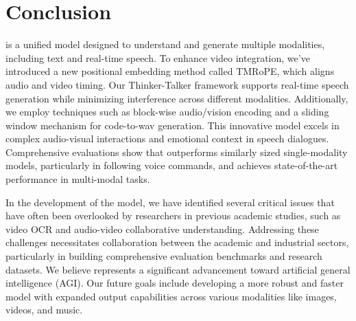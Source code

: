 
\section{Conclusion}
\label{sec:conclusion}
\method is a unified model designed to understand and generate multiple modalities, including text and real-time speech. To enhance video integration, we've introduced a new positional embedding method called TMRoPE, which aligns audio and video timing. Our Thinker-Talker framework supports real-time speech generation while minimizing interference across different modalities. Additionally, we employ techniques such as block-wise audio/vision encoding and a sliding window mechanism for code-to-wav generation. This innovative model excels in complex audio-visual interactions and emotional context in speech dialogues. Comprehensive evaluations show that \method outperforms similarly sized single-modality models, particularly in following voice commands, and achieves state-of-the-art performance in multi-modal tasks.

In the development of the model, we have identified several critical issues that have often been overlooked by researchers in previous academic studies, such as video OCR and audio-video collaborative understanding. Addressing these challenges necessitates collaboration between the academic and industrial sectors, particularly in building comprehensive evaluation benchmarks and research datasets. We believe \method represents a significant advancement toward artificial general intelligence (AGI). Our future goals include developing a more robust and faster model with expanded output capabilities across various modalities like images, videos, and music. 

